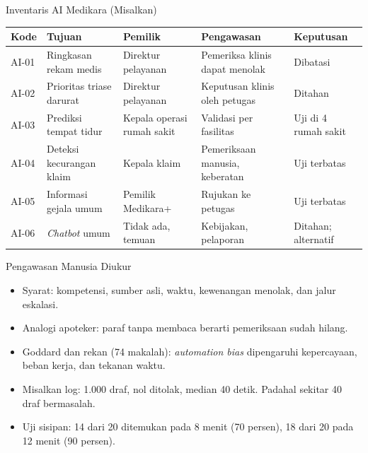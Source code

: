 \documentclass[aspectratio=169, table, 12pt]{beamer}
\begin{document}
\begin{frame}{{\Large Inventaris AI Medikara (Misalkan)}}
  \vspace{2pt}
  \scriptsize
  \begin{tabularx}{\textwidth}{|>{\raggedright\arraybackslash}p{}|>{\raggedright\arraybackslash}X|>{\raggedright\arraybackslash}p{}|>{\raggedright\arraybackslash}X|>{\raggedright\arraybackslash}p{}|}
    \hline
    \textbf{Kode} & \textbf{Tujuan} & \textbf{Pemilik} & \textbf{Pengawasan} & \textbf{Keputusan} \\
    \hline
    AI-01 & Ringkasan rekam medis & Direktur pelayanan & Pemeriksa klinis dapat menolak & Dibatasi
    \\ \hline
    AI-02 & Prioritas triase darurat & Direktur pelayanan & Keputusan klinis oleh petugas & Ditahan
    \\ \hline
    AI-03 & Prediksi tempat tidur & Kepala operasi rumah sakit & Validasi per fasilitas & Uji di 4
    rumah sakit \\ \hline
    AI-04 & Deteksi kecurangan klaim & Kepala klaim & Pemeriksaan manusia, keberatan & Uji terbatas
    \\ \hline
    AI-05 & Informasi gejala umum & Pemilik Medikara+ & Rujukan ke petugas & Uji terbatas \\ \hline
    AI-06 & \textit{Chatbot} umum & Tidak ada, temuan & Kebijakan, pelaporan & Ditahan; alternatif
    \\ \hline
  \end{tabularx}
\end{frame}

\begin{frame}{{\Large Pengawasan Manusia Diukur}}
  \vspace{6pt}
  \small
  \begin{itemize}
    \item Syarat: kompetensi, sumber asli, waktu, kewenangan menolak, dan jalur eskalasi.
    \item Analogi apoteker: paraf tanpa membaca berarti pemeriksaan sudah hilang.
    \item Goddard dan rekan (74 makalah): \textit{automation bias} dipengaruhi kepercayaan, beban
          kerja, dan tekanan waktu.
    \item Misalkan log: 1.000 draf, nol ditolak, median 40 detik. Padahal sekitar 40 draf
          bermasalah.
    \item Uji sisipan: 14 dari 20 ditemukan pada 8 menit (70 persen), 18 dari 20 pada 12 menit (90
          persen).
  \end{itemize}
\end{frame}
\end{document}

